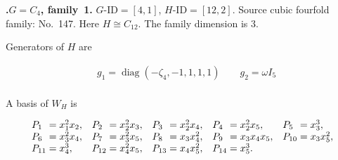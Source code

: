 \documentclass[12pt]{amsart}
\makeatletter
\numberwithin{equation}{section}
\theoremstyle{plain}
\theoremstyle{definition}
\theoremstyle{remark}
\DeclareMathOperator{\diag}{diag}
\newcommand{\PBasisLabel}[1]{\mathrlap{P_{#1}}\phantom{P_{99}}}
\newenvironment{SecEightAlignedBasis}[1]{%
  \begingroup\renewcommand{\arraystretch}{1.18}%
  \[\begin{array}{@{}#1@{}}%
}{\end{array}\]\endgroup}
\newenvironment{familydisplay}{%
  \begingroup
  \setlength{\arraycolsep}{1.35pt}%
  \renewcommand{\arraystretch}{0.96}%
  \setlength{\jot}{2pt}%
}{\endgroup}
\makeatother
\begin{document}
\par{}\medskip\noindent\textbf{.\enspace $G=C_4$, family~1.}\label{fam:threefold-no-36}
$G\text{-ID}=[4,1]$, $H\text{-ID}=[12,2]$.
Source cubic fourfold family: No.~147.  Here
$H\cong C_{12}$.
The family dimension is $3$.
\par\smallskip\noindent Generators of $H$ are\par\nopagebreak
\begin{familydisplay}
\begin{align*}
&g_{1}=\diag(-\zeta_4,-1,1,1,1)
\qquad g_{2}=\omega I_5\\
\end{align*}
\end{familydisplay}
\par\smallskip\noindent A basis of $W_H$ is\par\nopagebreak
\begin{familydisplay}
\begin{SecEightAlignedBasis}{l@{\quad}l@{\quad}l@{\quad}l@{\quad}l}
\PBasisLabel{1}=x_{1}^{2}x_{2}, & \PBasisLabel{2}=x_{2}^{2}x_{3}, & \PBasisLabel{3}=x_{2}^{2}x_{4}, & \PBasisLabel{4}=x_{2}^{2}x_{5}, & \PBasisLabel{5}=x_{3}^{3},\\
\PBasisLabel{6}=x_{3}^{2}x_{4}, & \PBasisLabel{7}=x_{3}^{2}x_{5}, & \PBasisLabel{8}=x_{3}x_{4}^{2}, & \PBasisLabel{9}=x_{3}x_{4}x_{5}, & \PBasisLabel{10}=x_{3}x_{5}^{2},\\
\PBasisLabel{11}=x_{4}^{3}, & \PBasisLabel{12}=x_{4}^{2}x_{5}, & \PBasisLabel{13}=x_{4}x_{5}^{2}, & \multicolumn{2}{@{}l@{}}{\PBasisLabel{14}=x_{5}^{3}.}
\end{SecEightAlignedBasis}
\end{familydisplay}
\end{document}
